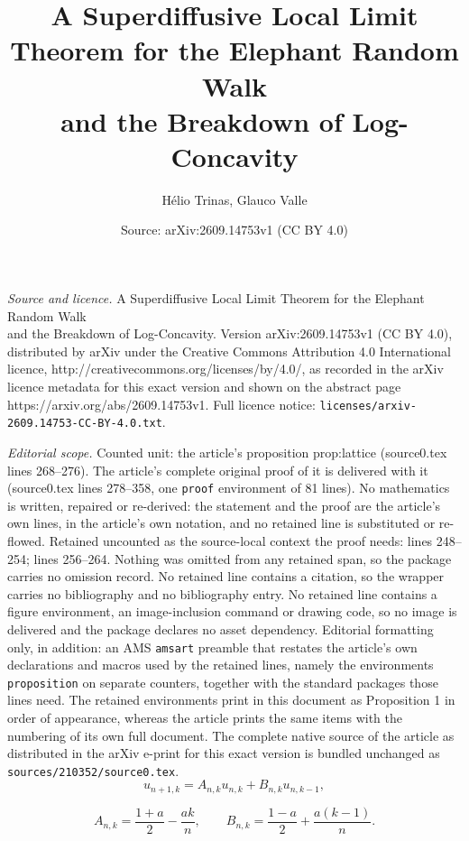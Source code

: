 \documentclass[10pt,a4paper]{amsart}
\title{A Superdiffusive Local Limit Theorem for the Elephant Random Walk\\ and the Breakdown of Log-Concavity}
\author{H\'elio Trinas, Glauco Valle}
\date{Source: arXiv:2609.14753v1 (CC BY 4.0)}
\begin{document}
\maketitle

\noindent\emph{Source and licence.} A Superdiffusive Local Limit Theorem for the Elephant Random Walk\\ and the Breakdown of Log-Concavity. Version arXiv:2609.14753v1 (CC BY 4.0), distributed by arXiv under the Creative Commons Attribution 4.0 International licence, http://creativecommons.org/licenses/by/4.0/, as recorded in the arXiv licence metadata for this exact version and shown on the abstract page https://arxiv.org/abs/2609.14753v1. Full licence notice: \texttt{licenses/arxiv-2609.14753-CC-BY-4.0.txt}.\par\smallskip

\noindent\textit{Editorial scope.} Counted unit: the article's proposition prop:lattice (source0.tex lines 268--276). The article's complete original proof of it is delivered with it (source0.tex lines 278--358, one \texttt{proof} environment of 81 lines). No mathematics is written, repaired or re-derived: the statement and the proof are the article's own lines, in the article's own notation, and no retained line is substituted or re-flowed.  Retained uncounted as the source-local context the proof needs: lines 248--254; lines 256--264.  Nothing was omitted from any retained span, so the package carries no omission record.  No retained line contains a citation, so the wrapper carries no bibliography and no bibliography entry.  No retained line contains a figure environment, an image-inclusion command or drawing code, so no image is delivered and the package declares no asset dependency.  Editorial formatting only, in addition: an AMS \texttt{amsart} preamble that restates the article's own declarations and macros used by the retained lines, namely the environments \texttt{proposition} on separate counters, together with the standard packages those lines need.  The retained environments print in this document as Proposition 1 in order of appearance, whereas the article prints the same items with the numbering of its own full document.  The complete native source of the article as distributed in the arXiv e-print for this exact version is bundled unchanged as \texttt{sources/210352/source0.tex}.
\begin{equation}\label{eq:massrec}
u_{n+1,k}
=
A_{n,k}u_{n,k}
+
B_{n,k}u_{n,k-1},
\end{equation}

\begin{equation}\label{eq:coefficients}
A_{n,k}
=
\frac{1+a}{2}-\frac{ak}{n},
\qquad
B_{n,k}
=
\frac{1-a}{2}+\frac{a(k-1)}{n}.
\end{equation}
\end{document}
